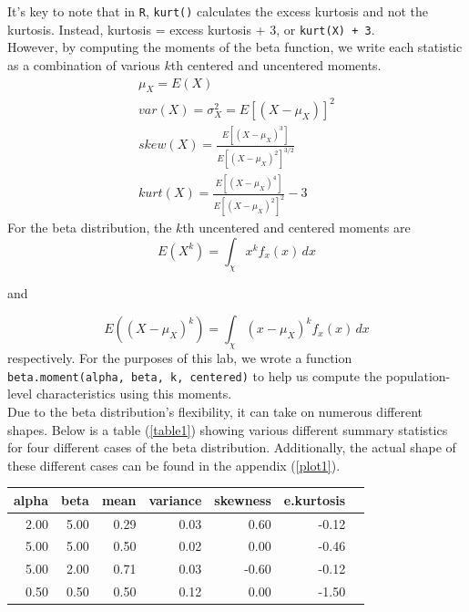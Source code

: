 \documentclass{article}\usepackage[]{graphicx}\usepackage[]{xcolor}
\newenvironment{Figure}
  {\par\medskip\noindent\minipage{\linewidth}}
  {\endminipage\par\medskip}
\begin{document}
\begin{multicols}{2}
\indent It's key to note that in \texttt{R}, \verb|kurt()| calculates the excess kurtosis and not the kurtosis. Instead, kurtosis = excess kurtosis + 3, or \verb|kurt(X) + 3|. \\
\indent However, by computing the moments of the beta function, we write each statistic as a combination of various $k$th centered and uncentered moments. 
\begin{align*}
 \mu_X = E(X) \tag{The Mean}\\
 var(X) = \sigma^2_X = E[(X-\mu_X)]^2 \tag{The Variance}\\
 skew(X) = \frac{E[(X - \mu_X)^3]}{E[(X-\mu_X)^2]^{3/2}} \tag{The Skewness}\\
 kurt(X) = \frac{E[(X-\mu_X)^4]}{E[(X-\mu_X)^2]^2} - 3 \tag{The Excess Kurtsosis}
\end{align*}
\indent For the beta distribution, the $k$th uncentered and centered moments are
\[E(X^{k}) = \int_{\chi}^{} x^{k}f_x(x) \,dx \]
\begin{center}
and 
\end{center}
\[E((X-\mu_X)^{k}) = \int_{\chi}^{} (x-\mu_X)^{k}f_x(x) \,dx \]
respectively. For the purposes of this lab, we wrote a function \verb|beta.moment(alpha, beta, k, centered)| to help us compute the population-level characteristics using this moments. \\

\indent Due to the beta distribution's flexibility, it can take on numerous different shapes. Below is a table (\autoref{table1}) showing various different summary statistics for four different cases of the beta distribution. Additionally, the actual shape of these different cases can be found in the appendix (\autoref{plot1}). 

\begin{Figure}
\centering
\begin{tabular}{rrrrrrr}
  \hline
  alpha & beta & mean & variance & skewness & e.kurtosis \\ 
  \hline
  2.00 & 5.00 & 0.29 & 0.03 & 0.60 & -0.12 \\ 
  5.00 & 5.00 & 0.50 & 0.02 & 0.00 & -0.46 \\ 
  5.00 & 2.00 & 0.71 & 0.03 & -0.60 & -0.12 \\ 
  0.50 & 0.50 & 0.50 & 0.12 & 0.00 & -1.50 \\ 
   \hline
\end{tabular}
\label{table1}
\end{Figure}


\end{multicols}
\end{document}
